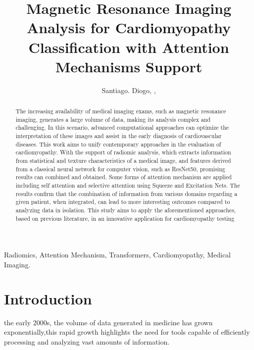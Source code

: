 \documentclass[journal,twoside,web]{ieeecolor}
\begin{document}
\title{Magnetic Resonance Imaging Analysis for Cardiomyopathy Classification with Attention Mechanisms Support}

\author{
   Santiago. Diogo, ,
   
}

\maketitle

\begin{abstract}
The increasing availability of medical imaging exams, such as magnetic resonance imaging, generates a large volume of data, making its analysis complex and challenging. In this scenario, advanced computational approaches can optimize the interpretation of these images and assist in the early diagnosis of cardiovascular diseases. This work aims to unify contemporary approaches in the evaluation of cardiomyopathy. 
With the support of radiomic analysis, which extracts information from statistical and texture characteristics of a medical image, and features derived from a classical neural network for computer vision, such as ResNet50, promising results can combined and obtained. Some forms of attention mechanism are applied including self attention and selective attention using Squeeze and Excitation Nets.  The results confirm that the combination of information from various domains regarding a given patient, when integrated, can lead to more interesting outcomes compared to analyzing data in isolation. This study aims to apply the aforementioned approaches, based on previous literature, in an innovative application for cardiomyopathy testing
\end{abstract}

\begin{IEEEkeywords}
Radiomics, Attention Mechanism, Transformers, Cardiomyopathy, Medical Imaging.
\end{IEEEkeywords}


\section{Introduction}
\label{sec:introduction}
 the early 2000s, the volume of data generated in medicine has grown exponentially,this rapid growth highlights the need for tools capable of efficiently processing and analyzing vast amounts of information.
\end{document}
